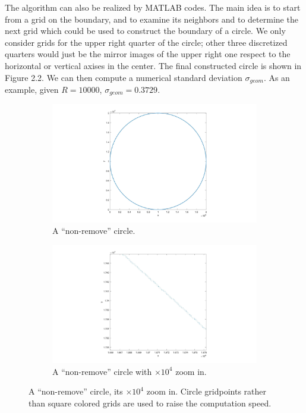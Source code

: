 \documentclass[letterpaper]{article}
\numberwithin{equation}{section} %
\numberwithin{figure}{section} %
\numberwithin{table}{section} %
\begin{document}
The algorithm can also be realized by MATLAB codes. The main idea is to start from a grid on the boundary, and to examine its neighbors and to determine the next grid which could be used to construct the boundary of a circle. We only consider grids for the upper right quarter of the circle; other three discretized quarters would just be the mirror images of the upper right one respect to the horizontal or vertical axises in the center. The final constructed circle is shown in Figure 2.2. We can then compute a numerical standard deviation $\sigma_{geom}$. As an example, given $R=10000$, $\sigma_{geom}=0.3729$.

\begin{figure}[htbp]
	\centering
	\begin{subfigure}[b]{0.6\textwidth}
		\includegraphics[width=\textwidth]{NonrmvCircle}
		\caption{A \enquote{non-remove} circle.}
		\label{NonrmvCircle}
	\end{subfigure}
	\begin{subfigure}[b]{0.6\textwidth}
		\includegraphics[width=\textwidth]{NonrmvCircleZI}
		\caption{A \enquote{non-remove} circle with $\times 10^4$ zoom in.}
		\label{NonrmvCircleZI}
	\end{subfigure}

	\caption{A \enquote{non-remove} circle, its $\times 10^4$ zoom in. Circle gridpoints rather than square colored grids are used to raise the computation speed. }
	\label{circle and zoom in}
\end{figure}
\end{document}
